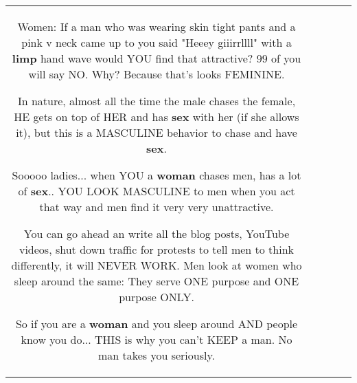 \documentclass[11pt]{article}
\newlength\mylength
\begin{document}
\begin{center}
\begin{longtable}{|C{.65\mylength}|C{.30\mylength}|C{.12\mylength}|C{.12\mylength}|C{.12\mylength}|}
Women: If a man who was wearing skin tight pants and a pink v neck came up to you said "Heeey giiirrllll" with a \textbf{limp} hand wave would YOU find that attractive? 99 of you will say NO. Why? Because that's looks FEMININE.

In nature, almost all the time the male chases the female, HE gets on top of HER and has \textbf{sex} with her (if she allows it), but this is a MASCULINE behavior to chase and have \textbf{sex}.

Sooooo ladies... when YOU a \textbf{woman} chases men, has a lot of \textbf{sex}.. YOU LOOK MASCULINE to men when you act that way and men find it very very unattractive.

You can go ahead an write all the blog posts, YouTube videos, shut down traffic for protests to tell men to think differently, it will NEVER WORK. Men look at women who sleep around the same: They serve ONE purpose and ONE purpose ONLY.

So if you are a \textbf{woman} and you sleep around AND people know you do... THIS is why you can't KEEP a man. No man takes you seriously.


\end{longtable}
\end{center}
\end{document}

